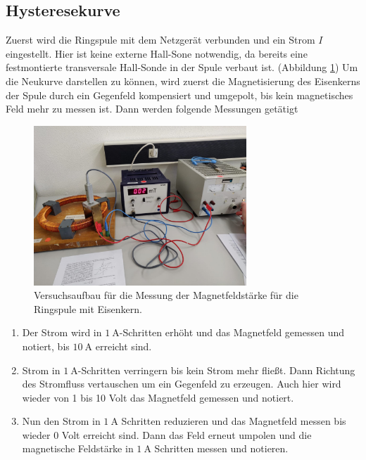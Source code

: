 \subsection{Hysteresekurve}
Zuerst wird die Ringspule mit dem Netzgerät verbunden und ein Strom $I$ eingestellt. Hier ist keine externe Hall-Sone notwendig,
da bereits eine festmontierte transversale Hall-Sonde in der Spule verbaut ist. (Abbildung \ref{fig:hysterese}) 
Um die Neukurve darstellen zu können, wird zuerst die Magnetisierung des Eisenkerns der Spule durch ein Gegenfeld
kompensiert und umgepolt, bis kein magnetisches Feld mehr zu messen ist. Dann werden folgende Messungen getätigt
\begin{figure}
    \centering
    \includegraphics[height=6cm]{content/ring.jpg}
    \caption{Versuchsaufbau für die Messung der Magnetfeldstärke für die Ringspule mit Eisenkern.}
    \label{fig:hysterese}
\end{figure}
\FloatBarrier
\begin{enumerate}
    \item Der Strom wird in $\SI{1}{\ampere}$-Schritten erhöht und das Magnetfeld gemessen und notiert, bis $\SI{10}{\ampere}$ erreicht sind.
    \item Strom in $\SI{1}{\ampere}$-Schritten verringern bis kein Strom mehr fließt. Dann Richtung
    des Stromfluss vertauschen um ein Gegenfeld zu erzeugen. Auch hier wird wieder von 1 bis 10 Volt das Magnetfeld gemessen und notiert.
    \item Nun den Strom in $\SI{1}{\ampere}$ Schritten reduzieren und das Magnetfeld messen bis wieder 0 Volt erreicht sind. Dann das Feld erneut umpolen
    und die magnetische Feldstärke in $\SI{1}{\ampere}$ Schritten messen und notieren.
\end{enumerate}